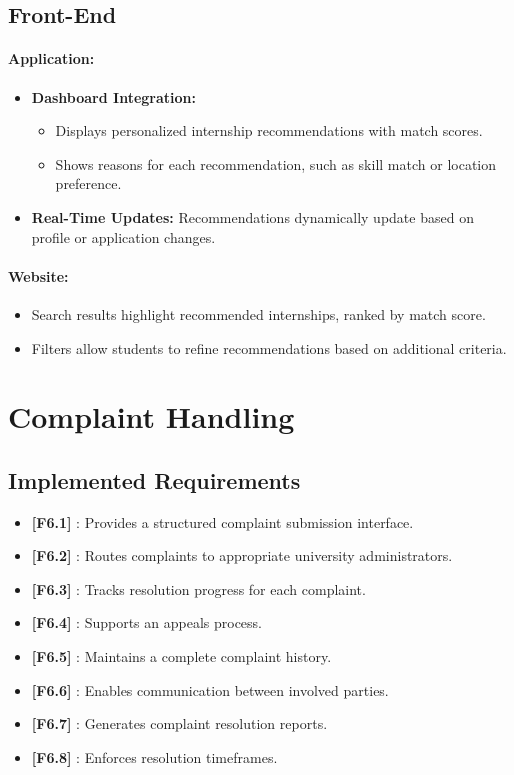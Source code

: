 \subsection*{Front-End}
\paragraph{Application:}
\begin{itemize}
    \item \textbf{Dashboard Integration:}
    \begin{itemize}
        \item Displays personalized internship recommendations with match scores.
        \item Shows reasons for each recommendation, such as skill match or location preference.
    \end{itemize}
    \item \textbf{Real-Time Updates:} Recommendations dynamically update based on profile or application changes.
\end{itemize}

\paragraph{Website:}
\begin{itemize}
    \item Search results highlight recommended internships, ranked by match score.
    \item Filters allow students to refine recommendations based on additional criteria.
\end{itemize}

\section{Complaint Handling}
\subsection*{Implemented Requirements}
\begin{itemize}
    \item \textbf{[F6.1]} : Provides a structured complaint submission interface.
    \item \textbf{[F6.2]} : Routes complaints to appropriate university administrators.
    \item \textbf{[F6.3]} : Tracks resolution progress for each complaint.
    \item \textbf{[F6.4]} : Supports an appeals process.
    \item \textbf{[F6.5]} : Maintains a complete complaint history.
    \item \textbf{[F6.6]} : Enables communication between involved parties.
    \item \textbf{[F6.7]} : Generates complaint resolution reports.
    \item \textbf{[F6.8]} : Enforces resolution timeframes.
\end{itemize}

